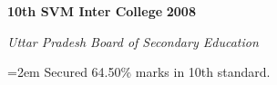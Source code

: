 \documentclass[paper=a4,fontsize=11pt]{scrartcl} %
\newcommand{\sepspace}{\vspace*{1em}}		%
\newcommand{\EducationEntry}[4]{
		\noindent \textbf{#1} \hfill      %
		\textbf{#2} \par  %
		\noindent \textit{#3} \par        %
		\noindent\hangindent=2em\hangafter=0 \small #4 %
		\normalsize \par}
\begin{document}
            \sepspace
        \EducationEntry
                {10th SVM Inter College}
                {2008}
                {Uttar Pradesh Board of Secondary Education}
                {Secured 64.50\% marks in 10th standard.}
            \sepspace
\end{document}
